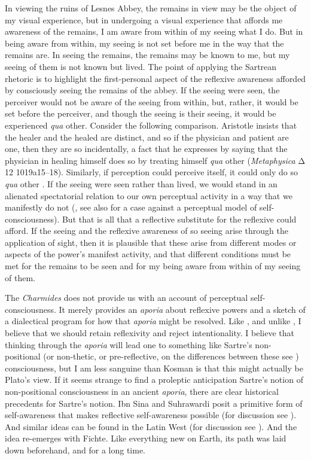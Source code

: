 In viewing the ruins of Lesnes Abbey, the remains in view may be the object of my visual experience, but in undergoing a visual experience that affords me awareness of the remains, I am aware from within of my seeing what I do. But in being aware from within, my seeing is not set before me in the way that the remains are. In seeing the remains, the remains may be known to me, but my seeing of them is not known but lived. The point of applying the Sartrean rhetoric is to highlight the first-personal aspect of the reflexive awareness afforded by consciously seeing the remains of the abbey. If the seeing were seen, the perceiver would not be aware of the seeing from within, but, rather, it would be set before the perceiver, and though the seeing is their seeing, it would be experienced \emph{qua} other. Consider the following comparison. Aristotle insists that the healer and the healed are distinct, and so if the physician and patient are one, then they are so incidentally, a fact that he expresses by saying that the physician in healing himself does so by treating himself \emph{qua} other (\emph{Metaphysica} {\sbl Δ} 12 1019a15–18). Similarly, if perception could perceive itself, it could only do so \emph{qua} other \citep[8]{Rodl:2007aa}. If the seeing were seen rather than lived, we would stand in an alienated spectatorial relation to our own perceptual activity in a way that we manifestly do not (\citealt{Moran:2001aa}, see also \citealt{shoemaker96} for a case against a perceptual model of self-consciousness). But that is all that a reflective substitute for the reflexive could afford. If the seeing and the reflexive awareness of so seeing arise through the application of sight, then it is plausible that these arise from different modes or aspects of the power's manifest activity, and that different conditions must be met for the remains to be seen and for my being aware from within of my seeing of them.

The \emph{Charmides} does not provide us with an account of perceptual self-conscious\-ness. It merely provides an \emph{aporia} about reflexive powers and a sketch of a dialectical program for how that \emph{aporia} might be resolved. Like \citet{Kosman:2014aa}, and unlike \citet{McCabe:2007ss}, I believe that we should retain reflexivity and reject intentionality. I believe that thinking through the \emph{aporia} will lead one to something like Sartre's non-positional (or non-thetic, or pre-reflective, on the differences between these see \citealt{Webber:2002aa}) consciousness, but I am less sanguine than Kosman is that this might actually be Plato's view. If it seems strange to find a proleptic anticipation Sartre's notion of non-positional consciousness in an ancient \emph{aporia}, there are clear historical precedents for Sartre's notion. Ibn Sina and Suhrawardi posit a primitive form of self-awareness that makes reflective self-awareness possible (for discussion see \citealt{Kaukua:2014si}). And similar ideas can be found in the Latin West (for discussion see \citealt{Cory:2013oh}). And the idea re-emerges with Fichte. Like everything new on Earth, its path was laid down beforehand, and for a long time.

